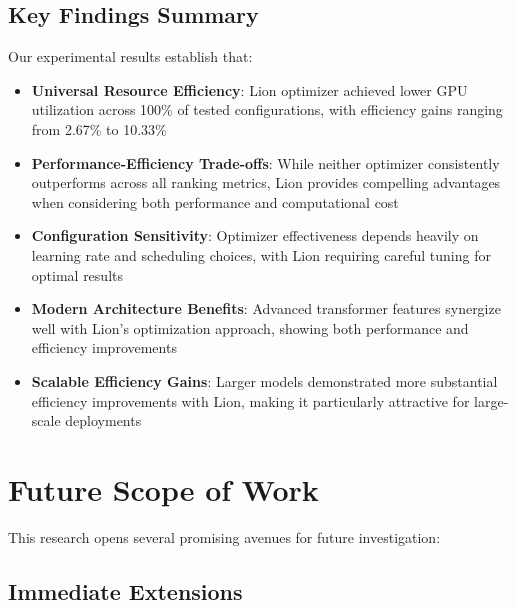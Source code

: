 \subsection{Key Findings Summary}

Our experimental results establish that:
\begin{itemize}
    \item \textbf{Universal Resource Efficiency}: Lion optimizer achieved lower GPU utilization across 100\% of tested configurations, with efficiency gains ranging from 2.67\% to 10.33\%
    \item \textbf{Performance-Efficiency Trade-offs}: While neither optimizer consistently outperforms across all ranking metrics, Lion provides compelling advantages when considering both performance and computational cost
    \item \textbf{Configuration Sensitivity}: Optimizer effectiveness depends heavily on learning rate and scheduling choices, with Lion requiring careful tuning for optimal results
    \item \textbf{Modern Architecture Benefits}: Advanced transformer features synergize well with Lion's optimization approach, showing both performance and efficiency improvements
    \item \textbf{Scalable Efficiency Gains}: Larger models demonstrated more substantial efficiency improvements with Lion, making it particularly attractive for large-scale deployments
\end{itemize}

\section{Future Scope of Work}

This research opens several promising avenues for future investigation:

\subsection{Immediate Extensions}

